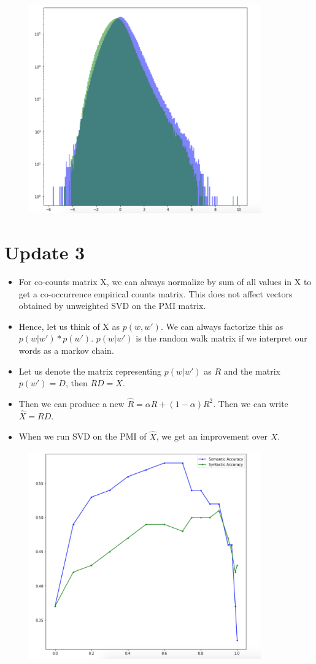\documentclass[12pt]{article}
\begin{document}
\begin{figure}[h]
\centering
\includegraphics[width=10cm]{pmidisttext8.png}
\end{figure}

\section{Update 3}
\begin{itemize}
\item For co-counts matrix X, we can always normalize by sum of all values in X to get a co-occurrence empirical counts matrix. This does not affect vectors obtained by unweighted SVD on the PMI matrix.
\item Hence, let us think of X as $p(w,w')$. We can always factorize this as $p(w|w')*p(w')$. $p(w|w')$ is the random walk matrix if we interpret our words as a markov chain. 
\item Let us denote the matrix representing $p(w|w')$ as $R$ and the matrix $p(w') = D$, then $RD = X$. 
\item Then we can produce a new $\hat{R} = \alpha R + (1-\alpha) R^2$. Then we can write $\hat{X} = RD$.
\item When we run SVD on the PMI of $\hat{X}$, we get an improvement over $X$.
\end{itemize}

\begin{figure}[h]
\centering
\includegraphics[width=10cm]{randwalkpower.png}
\end{figure}
\end{document}
